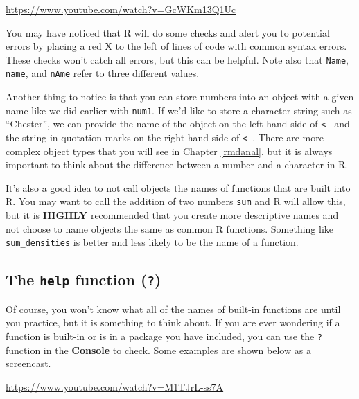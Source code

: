 \documentclass[]{tufte-book}
\begin{document}
\vspace{0.1in}\begin{center}\footnotesize{\url{https://www.youtube.com/watch?v=GcWKm13Q1Uc}}\end{center}\vspace{0.1in}

You may have noticed that R will do some checks and alert you to potential errors by placing a red X to the left of lines of code with common syntax errors. These checks won't catch all errors, but this can be helpful. Note also that \texttt{Name}, \texttt{name}, and \texttt{nAme} refer to three different values.

Another thing to notice is that you can store numbers into an object with a given name like we did earlier with \texttt{num1}. If we'd like to store a character string such as ``Chester'', we can provide the name of the object on the left-hand-side of \texttt{\textless{}-} and the string in quotation marks on the right-hand-side of \texttt{\textless{}-}. There are more complex object types that you will see in Chapter \ref{rmdanal}, but it is always important to think about the difference between a number and a character in R.

It's also a good idea to not call objects the names of functions that are built into R. You may want to call the addition of two numbers \texttt{sum} and R will allow this, but it is \textbf{HIGHLY} recommended that you create more descriptive names and not choose to name objects the same as common R functions. Something like \texttt{sum\_densities} is better and less likely to be the name of a function.

\hypertarget{the-help-function}{%
\subsection{\texorpdfstring{The \texttt{help} function (\texttt{?})}{The help function (?)}}\label{the-help-function}}

Of course, you won't know what all of the names of built-in functions are until you practice, but it is something to think about. If you are ever wondering if a function is built-in or is in a package you have included, you can use the \texttt{?} function in the \textbf{Console} to check. Some examples are shown below as a screencast.

\vspace{0.1in}\begin{center}\footnotesize{\url{https://www.youtube.com/watch?v=M1TJrL-ss7A}}\end{center}\vspace{0.1in}
\end{document}
